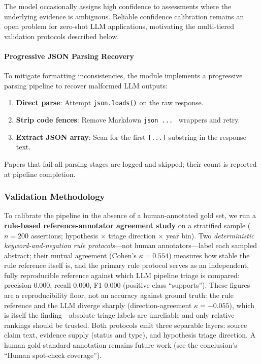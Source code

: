 \documentclass[
  english,
]{article}
\providecommand{\tightlist}{%
  \setlength{\itemsep}{0pt}\setlength{\parskip}{0pt}}
\begin{document}
The model occasionally assigns high confidence to assessments where the
underlying evidence is ambiguous. Reliable confidence calibration
remains an open problem for zero-shot LLM applications, motivating the
multi-tiered validation protocols described below.

\paragraph{Progressive JSON Parsing
Recovery}\label{progressive-json-parsing-recovery}

To mitigate formatting inconsistencies, the module implements a
progressive parsing pipeline to recover malformed LLM outputs:

\begin{enumerate}
\def\labelenumi{\arabic{enumi}.}
\tightlist
\item
  \textbf{Direct parse}: Attempt \texttt{json.loads()} on the raw
  response.
\item
  \textbf{Strip code fences}: Remove Markdown
  \texttt{\textasciigrave{}\textasciigrave{}\textasciigrave{}json\ ...\ \textasciigrave{}\textasciigrave{}\textasciigrave{}}
  wrappers and retry.
\item
  \textbf{Extract JSON array}: Scan for the first \texttt{{[}...{]}}
  substring in the response text.
\end{enumerate}

Papers that fail all parsing stages are logged and skipped; their count
is reported at pipeline completion.

\subsubsection{Validation Methodology}\label{validation-methodology}

To calibrate the pipeline in the absence of a human-annotated gold set,
we run a \textbf{rule-based reference-annotator agreement study} on a
stratified sample (\(n = 200\) assertions; hypothesis \(\times\) triage
direction \(\times\) year bin). Two \emph{deterministic
keyword-and-negation rule protocols}---not human annotators---label each
sampled abstract; their mutual agreement (Cohen's \(\kappa = 0.554\))
measures how stable the rule reference itself is, and the primary rule
protocol serves as an independent, fully reproducible reference against
which LLM pipeline triage is compared: precision 0.000, recall 0.000, F1
0.000 (positive class ``supports''). These figures are a reproducibility
floor, not an accuracy against ground truth: the rule reference and the
LLM diverge sharply (direction-agreement \(\kappa = -0.055\)), which is
itself the finding---absolute triage labels are unreliable and only
relative rankings should be trusted. Both protocols emit three separable
layers: source claim text, evidence supply (status and type), and
hypothesis triage direction. A human gold-standard annotation remains
future work (see the conclusion's ``Human spot-check coverage'').
\end{document}
